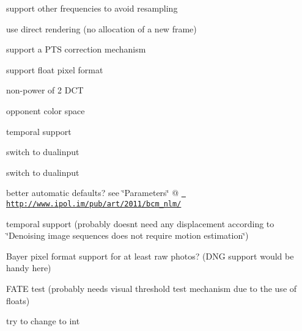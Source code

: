\begin{DoxyRefList}
\label{todo__todo000019}%
%
support other frequencies to avoid resampling  
\item[File \mbox{\hyperlink{src__movie_8c}{src\+\_\+movie.c}} ]\label{todo__todo000020}%
%
use direct rendering (no allocation of a new frame) 

\label{todo__todo000021}%
%
support a P\+TS correction mechanism  
\item[File \mbox{\hyperlink{vaf__spectrumsynth_8c}{vaf\+\_\+spectrumsynth.c}} ]\label{todo__todo000022}%
%
support float pixel format  
\item[Member \mbox{\hyperlink{vf__bm3d_8c_a4ed5505d8a295ee7868d89a349db930e}{M\+A\+X\+\_\+\+N\+B\+\_\+\+T\+H\+R\+E\+A\+DS}} ]\label{todo__todo000023}%
%

\begin{DoxyItemize}
\item non-\/power of 2 D\+CT
\item opponent color space
\item temporal support  
\end{DoxyItemize}
\item[Member \mbox{\hyperlink{vf__cover__rect_8c_a1a6b6fb557d8d37d59700faf4e4c9167}{mode}} ]\label{todo__todo000024}%
%
switch to dualinput  
\item[Member \mbox{\hyperlink{vf__find__rect_8c_a3dc0e4f2ea5907c6d669297ef29624df}{M\+A\+X\+\_\+\+M\+I\+P\+M\+A\+PS}} ]\label{todo__todo000025}%
%
switch to dualinput  
\item[Class \mbox{\hyperlink{structweighted__avg}{weighted\+\_\+avg}} ]\label{todo__todo000026}%
%

\begin{DoxyItemize}
\item better automatic defaults? see \char`\"{}\+Parameters\char`\"{} @ \href{http://www.ipol.im/pub/art/2011/bcm_nlm/}{\texttt{ http\+://www.\+ipol.\+im/pub/art/2011/bcm\+\_\+nlm/}}
\item temporal support (probably doesn\textquotesingle{}t need any displacement according to \char`\"{}\+Denoising image sequences does not require motion estimation\char`\"{})
\item Bayer pixel format support for at least raw photos? (D\+NG support would be handy here)
\item F\+A\+TE test (probably needs visual threshold test mechanism due to the use of floats)  
\end{DoxyItemize}
\item[Member \mbox{\hyperlink{vf__owdenoise_8c_a2d711e63a37cb40af93ce978c0cad575}{O\+W\+Denoise\+Context}} ]\label{todo__todo000027}%
%
try to change to int 


\end{DoxyRefList}
